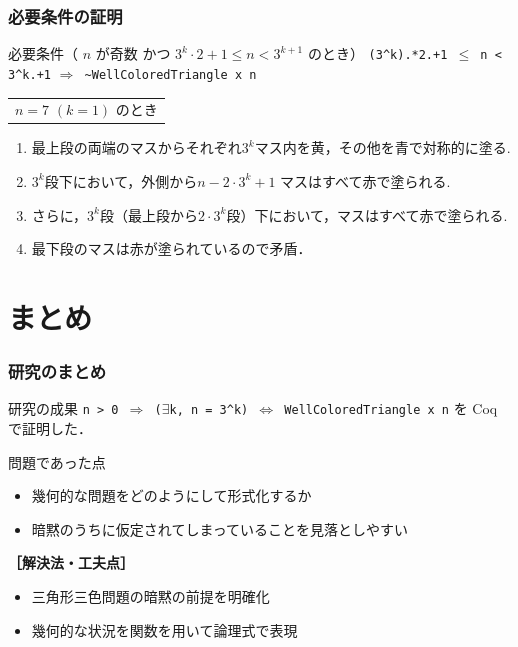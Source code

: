 \documentclass[dvipdfmx,cjk]{beamer}
\begin{document}
\begin{frame}[fragile]
  \frametitle{必要条件の証明}
  \begin{block}{必要条件（ $n$ が奇数 かつ $3^k \cdot 2 + 1 \leq n < 3^{k+1}$ のとき）}
    \color{red}
    {\tt{(3\verb|^|k).*2.+1 $\leq$ n < 3\verb|^|k.+1}}
    \color{black}      
    {\tt{$\Rightarrow$ \verb|~|WellColoredTriangle x n}}
  \end{block}
  {\footnotesize
    \vfill
    \begin{center}
      \begin{tabular}{c}
        
        \\
        $n=7$ $(k=1)$ のとき
      \end{tabular}
    \end{center}
    \begin{enumerate}
    \item
      最上段の両端のマスからそれぞれ$3^k$マス内を黄，その他を青で対称的に塗る.
    \item
      $3^k$段下において，外側から$ n - 2 \cdot 3^k + 1$ マスはすべて赤で塗られる.
    \item
      さらに，$3^k$段（最上段から$2 \cdot 3^k$段）下において，マスはすべて赤で塗られる.
    \item
      最下段のマスは赤が塗られているので矛盾．
    \end{enumerate}
  } 
\end{frame}

\section{まとめ}

\begin{frame}[fragile]
  \frametitle{研究のまとめ}
  \begin{block}{研究の成果}
    {\tt{n > 0 $\Rightarrow$ ($\exists$k, n = 3\verb|^|k) $\Leftrightarrow$ WellColoredTriangle x n}}
    を Coq で証明した．
  \end{block}
  \vfill
  \begin{alertblock}{問題であった点}
    \begin{itemize}
    \item
      幾何的な問題をどのようにして形式化するか
    \item
      暗黙のうちに仮定されてしまっていることを見落としやすい
    \end{itemize}
  \end{alertblock}
  \vfill
  \textbf{［解決法・工夫点］}
  \begin{itemize}
  \item
    三角形三色問題の暗黙の前提を明確化
  \item
    幾何的な状況を関数を用いて論理式で表現
  \end{itemize}
\end{frame}
\end{document}
